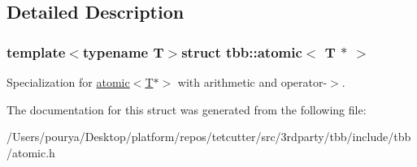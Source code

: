 \subsection{Detailed Description}
\subsubsection*{template$<$typename T$>$struct tbb\+::atomic$<$ T $\ast$ $>$}

Specialization for \hyperlink{structtbb_1_1atomic_3_01T_01_5_01_4}{atomic$<$\+T$\ast$$>$} with arithmetic and operator-\/$>$. 

The documentation for this struct was generated from the following file\+:\begin{DoxyCompactItemize}
\item 
/\+Users/pourya/\+Desktop/platform/repos/tetcutter/src/3rdparty/tbb/include/tbb/atomic.\+h\end{DoxyCompactItemize}

